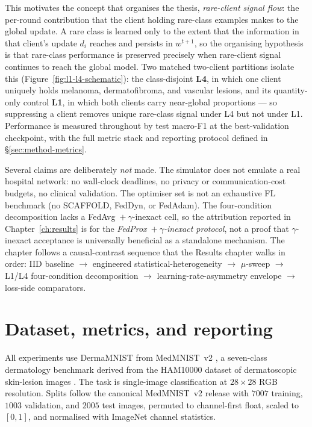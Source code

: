 \documentclass[11pt,a4paper]{report}
\begin{document}
This motivates the concept that organises the thesis, \emph{rare-client signal
flow}: the per-round contribution that the client holding rare-class examples
makes to the global update. A rare class is learned only to the extent that the
information in that client's update $d_i$ reaches and persists in $w^{t+1}$, so the
organising hypothesis is that rare-class performance is preserved precisely when
rare-client signal continues to reach the global model. Two matched two-client
partitions isolate this (Figure~\ref{fig:l1-l4-schematic}): the class-disjoint
\textbf{L4}, in which one client uniquely holds melanoma, dermatofibroma, and
vascular lesions, and its quantity-only control \textbf{L1}, in which both clients
carry near-global proportions --- so suppressing a client removes unique
rare-class signal under L4 but not under L1. Performance is measured throughout by
test macro-F1 at the best-validation checkpoint, with the full metric stack and
reporting protocol defined in \S\ref{sec:method-metrics}.

Several claims are deliberately \emph{not} made. The simulator does not emulate a
real hospital network: no wall-clock deadlines, no privacy or communication-cost
budgets, no clinical validation. The optimiser set is not an exhaustive FL
benchmark (no SCAFFOLD, FedDyn, or FedAdam). The four-condition decomposition
lacks a FedAvg~$+~\gamma$-inexact cell, so the attribution reported in
Chapter~\ref{ch:results} is for the \emph{FedProx~$+~\gamma$-inexact protocol},
not a proof that $\gamma$-inexact acceptance is universally beneficial as a
standalone mechanism. The chapter follows a causal-contrast sequence that the
Results chapter walks in order: IID baseline $\to$ engineered
statistical-heterogeneity $\to$ $\mu$-sweep $\to$ L1/L4 four-condition
decomposition $\to$ learning-rate-asymmetry envelope $\to$ loss-side comparators.

\section{Dataset, metrics, and reporting}
\label{sec:method-dataset}
\label{sec:method-metrics}

All experiments use DermaMNIST from MedMNIST~v2 \citep{yang2023medmnistv2}, a
seven-class dermatology benchmark derived from the HAM10000 dataset of
dermatoscopic skin-lesion images \citep{tschandl2018ham10000}. The task is
single-image classification at $28 \times 28$ RGB resolution. Splits follow the
canonical MedMNIST~v2 release with $7007$ training, $1003$ validation, and $2005$
test images, permuted to channel-first float, scaled to $[0, 1]$, and normalised
with ImageNet channel statistics.
\end{document}
